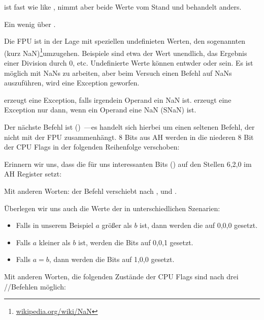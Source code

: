 


\FUCOMPP{} ist fast wie like \FCOM, nimmt aber beide Werte vom Stand und
behandelt  anders.


Ein wenig über .

\newcommand{\NANFN}{\footnote{\href{http://go.yurichev.com/17130}{wikipedia.org/wiki/NaN}}}
Die FPU ist in der Lage mit speziellen undefinieten Werten, den sogenannten
(kurz \gls{NaN})\NANFN umzugehen. Beispiele sind etwa der Wert
unendlich, das Ergebnis einer Division durch 0, etc. Undefinierte Werte können
entwder  oder  sein. Es ist möglich mit  NaNs zu
arbeiten, aber beim Versuch einen Befehl auf  NaNs auszuführen,
wird eine Exception geworfen. 

\FCOM erzeugt eine Exception, falls irgendein Operand ein \gls{NaN} ist.
\FUCOM erzeugt eine Exception nur dann, wenn ein Operand eine 
\gls{NaN} (SNaN) ist.

\label{SAHF}
Der nächste Befehl ist \SAHF ()~---es handelt sich
hierbei um einen seltenen Befehl, der nicht mit der FPU zusammenhängt.
8 Bits aus AH werden in die niederen 8 Bit der CPU Flags in der folgenden
Reihenfolge verschoben:



Erinnern wir uns, dass \FNSTSW die für uns interessanten Bits (\CThreeBits) auf
den Stellen 6,2,0 im AH Register setzt:


Mit anderen Worten: der Befehl  verschiebt \CThreeBits
nach \ZF, \PF und \CF. 

Überlegen wir uns auch die Werte der \CThreeBits in unterschiedlichen Szenarien:

\begin{itemize} 
  \item Falls in unserem Beispiel $a$ größer als $b$ ist, dann werden die
  \CThreeBits auf 0,0,0 gesetzt.
  \item Falls $a$ kleiner als $b$ ist, werden die Bits auf 0,0,1 gesetzt.
  \item Falls $a=b$, dann werden die Bits auf 1,0,0 gesetzt.
\end{itemize}
Mit anderen Worten, die folgenden Zustände der CPU Flags sind nach drei
\FUCOMPP/\FNSTSW/\SAHF Befehlen möglich:


